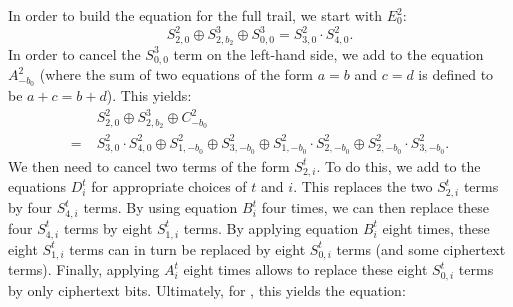 In order to build the equation for the full trail, we start with $E^2_0$:
\[
S^2_{2,0} \oplus S^{3}_{2,b_2} \oplus S^{3}_{0,0} = S^2_{3,0} \cdot S^2_{4,0}.
\]
In order to cancel the $S^{3}_{0,0}$ term on the left-hand side, we add to the equation $A^2_{-b_0}$ (where the sum of two equations of the form $a = b$ and $c = d$ is defined to be $a+c = b+d$). This yields:
\begin{align*}
&S^2_{2,0} \oplus S^3_{2,b_2} \oplus C^2_{-b_0}\\
=\; &S^2_{3,0} \cdot S^2_{4,0} \oplus S^2_{1,-b_0} \oplus S^2_{3,-b_0} \oplus S^2_{1,-b_0} \cdot S^2_{2,-b_0} \oplus S^2_{2,-b_0} \cdot S^2_{3,-b_0}.
\end{align*}
We then need to cancel two terms of the form $S^t_{2,i}$. To do this, we add to the equations $D^t_i$ for appropriate choices of $t$ and $i$. This replaces the two $S^t_{2,i}$ terms by four $S^t_{4,i}$ terms. By using equation $B^t_i$ four times, we can then replace these four $S^t_{4,i}$ terms by eight $S^t_{1,i}$ terms. By applying equation $B^t_i$ eight times, these eight $S^t_{1,i}$ terms can in turn be replaced by eight $S^t_{0,i}$ terms (and some ciphertext terms). Finally, applying $A^t_i$ eight times allows to replace these eight $S^t_{0,i}$ terms by only ciphertext bits. Ultimately, for \MiniMORUS[1280], this yields the equation:
